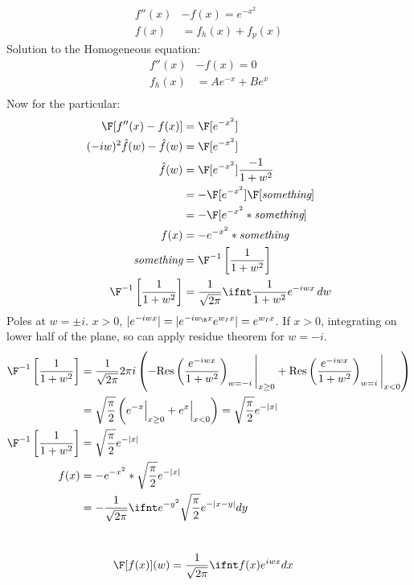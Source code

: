 \documentclass[cplx.tex]{subfiles}
\begin{document}
\begin{example}
\begin{align}
    f''(x) &- f(x) = e^{-x^2} \\
    f(x) &= f_h(x) + f_p(x) 
\end{align}
Solution to the Homogeneous equation:
\begin{align}
    f''(x) &- f(x) = 0 \\
    f_h(x) &= Ae^{-x} + Be^x \\
\end{align}
Now for the particular:
\begin{align}
    \F[f''(x) - f(x)] &= \F[e^{-x^2}] \\
    (-iw)^2\hat{f}(w) - \hat{f}(w) &= \F[e^{-x^2}] \\
    \hat{f}(w) &= \F[e^{-x^2}] \frac{-1}{1+w^2} \\
               &= -\F[e^{-x^2}] \F[\textit{something}] \\
               &= -\F[e^{-x^2}*\textit{something}] \\
    f(x) &= -e^{-x^2}*\textit{something} \\
    \textit{something} &= \F^{-1}\left[\frac{1}{1+w^2}\right] \\
    \F^{-1}\left[\frac{1}{1+w^2}\right] &= \frac{1}{\sqrt{2\pi}} \ifnt \frac{1}{1+w^2}e^{-iwx}\,dw
\end{align}
Poles at $w = \pm i$.
$x>0$, $|e^{-iwx}| = |e^{-iw_\R x}e^{w_I x}| = e^{w_I x}$.
If $x >0$, integrating on lower half of the plane, so can apply residue theorem for $w = -i$.
\begin{align}
    \F^{-1}\left[\frac{1}{1+w^2}\right] &= \frac{1}{\sqrt{2\pi}} 2\pi i\left(-\text{Res}\left(\frac{e^{-iwx}}{1+w^2}\right)_{w=-i}\Bigg|_{x\geq 0} + \text{Res}\left(\frac{e^{-iwx}}{1+w^2}\right)_{w=i}\Bigg|_{x<0}\right) \\
                                        &= \sqrt{\frac{\pi}{2}}\left(e^{-x}\Big|_{x\geq 0} + e^x\Big|_{x<0}\right) = \sqrt{\frac{\pi}{2}}e^{-|x|} \\
    \F^{-1}\left[\frac{1}{1+w^2}\right] &= \sqrt{\frac{\pi}{2}} e^{-|x|} \\
    f(x) &= -e^{-x^2}*\sqrt{\frac{\pi}{2}}e^{-|x|} \\
         &= -\frac{1}{\sqrt{2\pi}} \ifnt e^{-y^2}\sqrt{\frac{\pi}{2}} e^{-|x-y|}dy
\end{align}
\end{example}

\chapter{}
\begin{align}
    \F[f(x)](w) &= \frac{1}{\sqrt{2\pi}} \ifnt f(x)e^{iwx}dx
\end{align}
\end{document}
